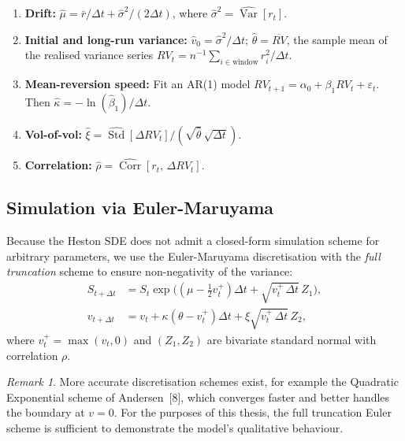 \documentclass[12pt, a4paper, oneside]{report}
\theoremstyle{plain}
\theoremstyle{definition}
\theoremstyle{remark}
\newtheorem{remark}[theorem]{Remark}
\newcommand{\Var}{\operatorname{Var}}
\begin{document}
\begin{enumerate}[leftmargin=1.25cm, label=\arabic*.]
  \item \textbf{Drift:}
    $\hat\mu = \bar r / \Delta t + \hat\sigma^2 / (2\Delta t)$,
    where $\hat\sigma^2 = \widehat{\Var}[r_t]$.
  \item \textbf{Initial and long-run variance:}
    $\hat v_0 = \hat\sigma^2 / \Delta t$;\quad
    $\hat\theta = \overline{RV}$, the sample mean of the realised variance series
    $RV_t = n^{-1}\sum_{i \in \text{window}} r_i^2 / \Delta t$.
  \item \textbf{Mean-reversion speed:}
    Fit an AR(1) model $RV_{t+1} = \alpha_0 + \beta_1 RV_t + \varepsilon_t$.
    Then $\hat\kappa = -\ln(\hat\beta_1) / \Delta t$.
  \item \textbf{Vol-of-vol:}
    $\hat\xi = \widehat{\operatorname{Std}}[\Delta RV_t] / (\sqrt{\hat\theta}\,\sqrt{\Delta t})$.
  \item \textbf{Correlation:}
    $\hat\rho = \widehat{\operatorname{Corr}}[r_t,\, \Delta RV_t]$.
\end{enumerate}

\subsection{Simulation via Euler-Maruyama}

Because the Heston SDE does not admit a closed-form simulation scheme for arbitrary
parameters, we use the Euler-Maruyama discretisation with the \emph{full truncation}
scheme to ensure non-negativity of the variance:
\begin{align}
  S_{t+\Delta t} &= S_t\exp\!\bigl(
    (\mu - \tfrac{1}{2}v_t^+)\Delta t + \sqrt{v_t^+\,\Delta t}\,Z_1
  \bigr), \label{eq:heston_euler_s}\\
  v_{t+\Delta t} &= v_t + \kappa(\theta - v_t^+)\Delta t
    + \xi\sqrt{v_t^+\,\Delta t}\,Z_2, \label{eq:heston_euler_v}
\end{align}
where $v_t^+ = \max(v_t, 0)$ and $(Z_1, Z_2)$ are bivariate standard normal with
correlation $\rho$.

\begin{remark}
More accurate discretisation schemes exist, for example the Quadratic Exponential
scheme of Andersen~[8], which converges faster and better handles the boundary
at $v = 0$.  For the purposes of this thesis, the full truncation Euler scheme
is sufficient to demonstrate the model's qualitative behaviour.
\end{remark}
\end{document}
